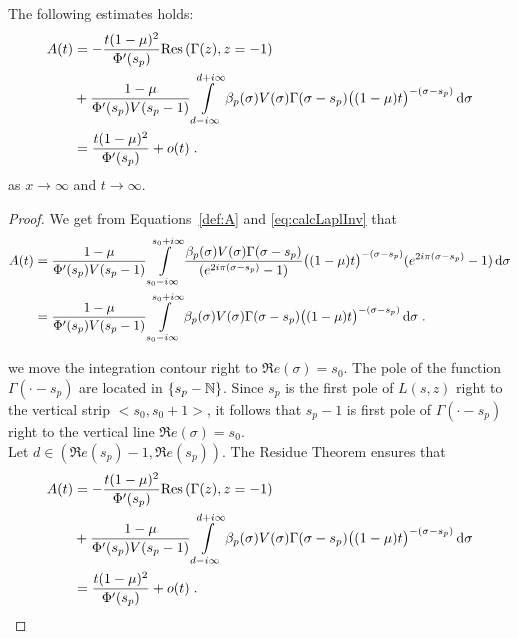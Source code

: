 \documentclass[11pt]{amsart}
\renewcommand{\Re}{\mathfrak{R}e}
\newcommand{\diff}{\,\mathrm{d}}
\newcommand{\res}{\mathrm{Res}\,}
\begin{document}
\begin{lemma} The following estimates holds: 
    \begin{align*}
        A(t) 
        &=  - \frac{t(1-\mu)^2}{\Phi'(s_p)} \res(\Gamma(z), z = -1) \\
        &+   \frac{1-\mu}{\Phi'(s_p) V(s_p-1)}
         \int\limits_{d-i\infty}^{d+i\infty}
         \beta_p(\sigma) V(\sigma)
       \Gamma(\sigma-s_p)\big((1-\mu)t\big)^{-(\sigma-s_p)} \diff \sigma \\
       &=  \frac{t(1-\mu)^2}{\Phi'(s_p)} + o(t)
      \eqfinp
    \end{align*}
    as $x \to \infty$ and $t \to \infty$.
\end{lemma}
\begin{proof}We get from Equations~\eqref{def:A} and \eqref{eq:calcLaplInv} that 
\begin{subequations}
    \begin{align}
    A(t) 
    &=
    \frac{1-\mu}{\Phi'(s_p) V(s_p-1)}
     \int\limits_{s_0-i\infty}^{s_0+i\infty}
     \frac{\beta_p(\sigma) V(\sigma)\Gamma(\sigma-s_p)
  }{(e^{2i\pi(\sigma-s_p)}-1)} \big((1-\mu)t\big)^{-(\sigma-s_p)}(e^{2i\pi(\sigma-s_p)}-1) \diff \sigma  \\
  &=  
   \frac{1-\mu}{\Phi'(s_p) V(s_p-1)}
     \int\limits_{s_0-i\infty}^{s_0+i\infty}
     \beta_p(\sigma) V(\sigma)
   \Gamma(\sigma-s_p)\big((1-\mu)t\big)^{-(\sigma-s_p)} \diff \sigma
  \eqfinp
\end{align}
\end{subequations}

we move the integration contour right to $\Re(\sigma) = s_0$. The pole of the function $\Gamma(\cdot-s_p)$ are located in $\{s_p - \mathbb{N}\}$. Since $s_p$ is the first pole of $L(s,z)$ right to the vertical strip $<s_0, s_0+1>$, it follows that $s_p-1$ is first pole of $\Gamma(\cdot-s_p)$ right to the vertical line $\Re(\sigma) = s_0$. \\

Let $d \in (\Re(s_p)-1,\Re(s_p))$. The Residue Theorem ensures that 
\begin{align*}
    A(t) 
    &=  - \frac{t(1-\mu)^2}{\Phi'(s_p)} \res(\Gamma(z), z = -1) \\
    & +   \frac{1-\mu}{\Phi'(s_p) V(s_p-1)}
     \int\limits_{d-i\infty}^{d+i\infty}
     \beta_p(\sigma) V(\sigma)
   \Gamma(\sigma-s_p)\big((1-\mu)t\big)^{-(\sigma-s_p)} \diff \sigma \\
   &=  \frac{t(1-\mu)^2}{\Phi'(s_p)} + o(t)
  \eqfinp
\end{align*}
\end{proof}
\end{document}

